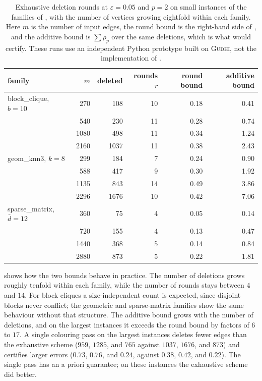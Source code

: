\documentclass[11pt,letterpaper]{article}
\theoremstyle{definition}
\newcommand{\eps}{\varepsilon}
\begin{document}
\begin{table}[ht]
\centering
\small
\begin{tabular}{@{}lrrrrr@{}}
\toprule
family & $m$ & deleted & rounds $r$ & round bound & additive bound \\
\midrule
block\_clique, $b=10$ &  270 &  108 & 10 & 0.18 & 0.41 \\
                      &  540 &  230 & 11 & 0.28 & 0.74 \\
                      & 1080 &  498 & 11 & 0.34 & 1.24 \\
                      & 2160 & 1037 & 11 & 0.38 & 2.43 \\
\midrule
geom\_knn3, $k=8$     &  299 &  184 &  7 & 0.24 & 0.90 \\
                      &  588 &  417 &  9 & 0.30 & 1.92 \\
                      & 1135 &  843 & 14 & 0.49 & 3.86 \\
                      & 2296 & 1676 & 10 & 0.42 & 7.06 \\
\midrule
sparse\_matrix, $\bar d=12$ &  360 &  75 & 4 & 0.05 & 0.14 \\
                      &  720 &  155 &  4 & 0.13 & 0.47 \\
                      & 1440 &  368 &  5 & 0.14 & 0.84 \\
                      & 2880 &  873 &  5 & 0.22 & 1.81 \\
\bottomrule
\end{tabular}
\caption{Exhaustive deletion rounds at $\eps=0.05$ and $p=2$ on small
instances of the families of , with the number of
vertices growing eightfold within each family. Here $m$ is the number of
input edges, the round bound is the right-hand side of , and
the additive bound is $\sum\rho_p$ over the same deletions, which is what
 would certify. These runs use an independent
Python prototype built on \textsc{Gudhi}, not the implementation of
.}
\label{tab:rounds}
\end{table}

 shows how the two bounds behave in practice. The number of
deletions grows roughly tenfold within each family, while the number of
rounds stays between $4$ and $14$. For block cliques a size-independent
count is expected, since disjoint blocks never conflict; the geometric and
sparse-matrix families show the same behaviour without that structure. The additive bound grows with the
number of deletions, and on the largest instances it exceeds the round bound
by factors of $6$ to $17$. A single colouring pass on the largest instances
deletes fewer edges than the exhaustive scheme ($959$, $1285$, and $765$
against $1037$, $1676$, and $873$) and certifies larger errors ($0.73$,
$0.76$, and $0.24$, against $0.38$, $0.42$, and $0.22$). The single pass has
an a priori guarantee; on these instances the exhaustive scheme did better.
\end{document}
